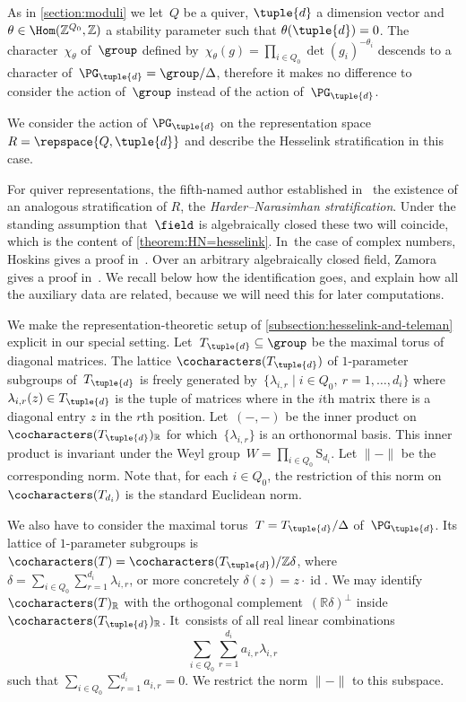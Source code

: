 \label{section:HN-vs-Hesselink}
As in \cref{section:moduli}
we let~$Q$ be a quiver, $\tuple{d}$ a dimension vector
and~$\theta \in\Hom(\mathbb{Z}^{Q_0},\mathbb{Z})$ a stability parameter
such that $\theta(\tuple{d})=0$.
The character~$\chi_\theta$ of~$\group$ defined by~$\chi_\theta(g) = \prod_{i \in Q_0} \det(g_i)^{-\theta_i}$
descends to a character of~$\PG_{\tuple{d}} = \group/\Delta$,
therefore it makes no difference to consider the action of~$\group$ instead of the action of~$\PG_{\tuple{d}}$.

We consider the action of $\PG_{\tuple{d}}$ on the representation space $R = \repspace{Q,\tuple{d}}$
and describe the Hesselink stratification in this case.

For quiver representations, the fifth-named author established in~\cite[Prop.\,3.4]{MR1974891}
the existence of an analogous stratification of $R$, the \emph{Harder--Narasimhan stratification}.
Under the standing assumption that~$\field$ is algebraically closed these two will coincide,
which is the content of \cref{theorem:HN=hesselink}. In~the case of complex numbers,
Hoskins gives a proof in~\cite[Th.\,3.8]{MR3871820}.
Over an arbitrary algebraically closed field,
Zamora gives a proof in~\cite[Th.\,6.3]{MR3199484}.
We recall below how the identification goes,
and explain how all the auxiliary data are related,
because we will need this for later computations.

We make the representation-theoretic setup of \cref{subsection:hesselink-and-teleman}
explicit in our special setting.
Let~$T_{\tuple{d}} \subseteq \group$ be the maximal torus of diagonal matrices.
The lattice $\cocharacters(T_{\tuple{d}})$ of $1$-parameter subgroups of~$T_{\tuple{d}}$
is freely generated by~$\{\lambda_{i,r} \mid i \in Q_0,\ r=1,\ldots,d_i\}$
where~$\lambda_{i,r}(z) \in T_{\tuple{d}}$
is the tuple of matrices where in the $i$th matrix there is a diagonal entry $z$
in the $r$th position.
Let~$(-,-)$ be the inner product on~$\cocharacters(T_{\tuple{d}})_\mathbb{R}$
for which~$\{\lambda_{i,r}\}$ is an orthonormal basis.
This inner product is invariant under the Weyl group~$W = \prod_{i \in Q_0}\mathrm{S}_{d_i}$.
Let $\|{-}\|$ be the corresponding norm.
Note that,
for each $i \in Q_0$,
the restriction of this norm on $\cocharacters(T_{d_i})$ is the standard Euclidean norm.

We also have to consider the maximal torus~$T = T_{\tuple{d}}/\Delta$ of~$\PG_{\tuple{d}}$.
Its lattice of $1$-parameter subgroups is~$\cocharacters(T) = \cocharacters(T_{\tuple{d}})/\mathbb{Z}\delta$,
where $\delta = \sum_{i\in Q_0}\sum_{r=1}^{d_i}\lambda_{i,r}$,
or more concretely $\delta(z) \!=\! z\cdot \operatorname{id}$.
We may identify~$\cocharacters(T)_\mathbb{R}$ with
the \hbox{orthogonal} complement~$(\mathbb{R}\delta)^\bot$ inside~$\cocharacters(T_{\tuple{d}})_\mathbb{R}$. It~consists of all real linear combinations
\[
\sum_{i\in Q_0}\sum_{r=1}^{d_i} a_{i,r}\lambda_{i,r}
\]
such that $\sum_{i\in Q_0}\sum_{r=1}^{d_i} a_{i,r} = 0$.
We restrict the norm $\|{-}\|$ to this subspace.

